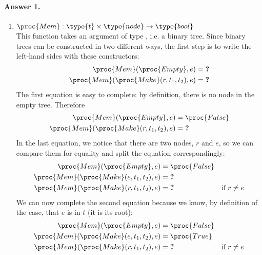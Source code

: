 \paragraph{Answer 1.} 

  \begin{enumerate}

     \item \(\proc{Mem}: \type{t} \times \type{node} \rightarrow
     \type{bool}\)\\
     This function takes an argument of type , i.e. a
       binary tree. Since binary trees can be constructed in two
       different ways, the first step is to write the left-hand sides
       with these constructors:
       \begin{align*}
         \proc{Mem} (\proc{Empty}, e) &= \textbf{?}\\
         \proc{Mem} (\proc{Make} (r, t_1, t_2), e) &= \textbf{?}
       \end{align*}
       The first equation is easy to complete: by definition,
         there is no node in the empty tree. Therefore
       \begin{align*}
         \proc{Mem} (\proc{Empty}, e) &= \proc{False}\\
         \proc{Mem} (\proc{Make} (r, t_1, t_2), e) &= \textbf{?}
       \end{align*}
       In the last equation, we notice that there are two nodes,
         \(r\) and \(e\), so we can compare them for equality and
         split the equation correspondingly:
       \begin{align*}
            \proc{Mem} (\proc{Empty}, e) 
         &= \proc{False}\\
            \proc{Mem} (\proc{Make} (e, t_1, t_2), e) 
         &= \textbf{?}\\
            \proc{Mem} (\proc{Make} (r, t_1, t_2), e) 
         &= \textbf{?} 
         & \text{if} \; r \neq e
       \end{align*}
       We can now complete the second equation because we know,
         by definition of the case, that \(e\) is in \(t\) (it is its
         root):
       \begin{align*}
            \proc{Mem} (\proc{Empty}, e) 
         &= \proc{False}\\
            \proc{Mem} (\proc{Make} (e, t_1, t_2), e) 
         &= \proc{True}\\
            \proc{Mem} (\proc{Make} (r, t_1, t_2), e) 
         &= \textbf{?} 
         & \text{if} \; r \neq e
       \end{align*}

\end{enumerate}
